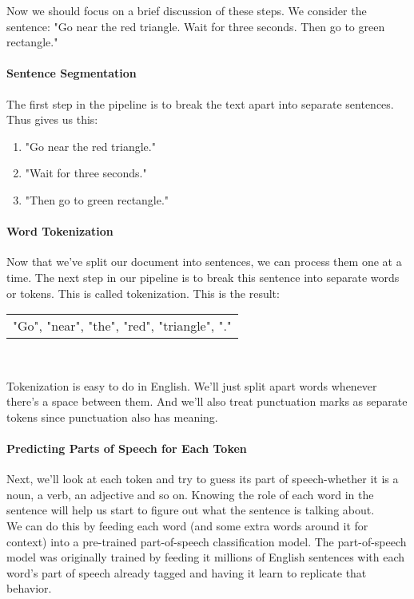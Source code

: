 Now we should focus on a brief discussion of these steps. We consider the sentence: "Go near the red triangle. Wait for three seconds. Then go to green rectangle."\\

\paragraph{Sentence Segmentation}
The first step in the pipeline is to break the text apart into separate sentences. Thus gives us this:
\begin{enumerate}
    \item "Go near the red triangle."
    \item "Wait for three seconds."
    \item "Then go to green rectangle."
\end{enumerate}

\paragraph{Word Tokenization}
Now that we’ve split our document into sentences, we can process them one at a time. The next step in our pipeline is to break this sentence into separate words or tokens. This is called tokenization. This is the result: \\

\begin{tabular}{|p{10cm}}
    "Go", "near", "the", "red", "triangle", "." 
\end{tabular}\\
\vline


Tokenization is easy to do in English. We’ll just split apart words whenever there’s a space between them. And we’ll also treat punctuation marks as separate tokens since punctuation also has meaning.

\paragraph{Predicting Parts of Speech for Each Token}
Next, we'll look at each token and try to guess its part of speech-whether it is a noun, a verb, an adjective and so on. Knowing the role of each word in the sentence will help us start to figure out what the sentence is talking about.\\

We can do this by feeding each word (and some extra words around it for context) into a pre-trained part-of-speech classification model. The part-of-speech model was originally trained by feeding it millions of English sentences with each word’s part of speech already tagged and having it learn to replicate that behavior.\\

